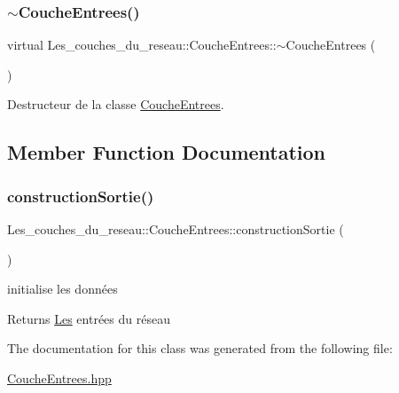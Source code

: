 \subsubsection{\texorpdfstring{$\sim$\+Couche\+Entrees()}{~CoucheEntrees()}}
{\footnotesize\ttfamily virtual Les\+\_\+couches\+\_\+du\+\_\+reseau\+::\+Couche\+Entrees\+::$\sim$\+Couche\+Entrees (\begin{DoxyParamCaption}{ }\end{DoxyParamCaption})\hspace{0.3cm}{\ttfamily [virtual]}}



Destructeur de la classe \hyperlink{class_les__couches__du__reseau_1_1_couche_entrees}{Couche\+Entrees}. 



\subsection{Member Function Documentation}
\mbox{\label{class_les__couches__du__reseau_1_1_couche_entrees_a52ed50cfc77b6aa116e1966faa349759}} 
\subsubsection{\texorpdfstring{construction\+Sortie()}{constructionSortie()}}
{\footnotesize\ttfamily Les\+\_\+couches\+\_\+du\+\_\+reseau\+::\+Couche\+Entrees\+::construction\+Sortie (\begin{DoxyParamCaption}{ }\end{DoxyParamCaption})}



initialise les données 

\begin{DoxyReturn}{Returns}
\hyperlink{namespace_les}{Les} entrées du réseau 
\end{DoxyReturn}


The documentation for this class was generated from the following file\+:\begin{DoxyCompactItemize}
\item 
\hyperlink{_couche_entrees_8hpp}{Couche\+Entrees.\+hpp}\end{DoxyCompactItemize}
